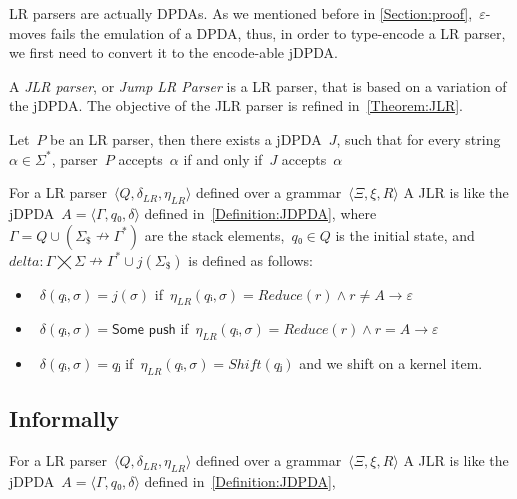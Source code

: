 LR parsers are actually DPDAs\@. As we mentioned before in \cref{Section:proof},~$ε$-moves
  fails the emulation of a DPDA, thus, in order to type-encode a LR parser, we first need
  to convert it to the encode-able jDPDA\@.

A \emph{JLR parser}, or \emph{Jump LR Parser} is a LR parser, that
  is based on a variation of the jDPDA\@.
The objective of the JLR parser is refined in~\cref{Theorem:JLR}.

\begin{Theorem}
  \label{Theorem:JLR}
  Let~$P$ be an LR parser, then there exists a jDPDA~$J$,
  such that for every string~$α∈Σ^*$, parser~$P$ accepts~$α$
    if and only if~$J$ accepts~$α$
\end{Theorem}

For a LR parser~$⟨Q,δ_{LR}, η_{LR}⟩$ defined over a grammar~$⟨Ξ,ξ,R⟩$
A JLR is like the jDPDA~$A=⟨Γ,q₀,δ⟩$ defined in~\cref{Definition:JDPDA},
  where~$Γ= Q∪(Σ_\$↛Γ^*)$ are the stack elements,~$q₀∈Q$
  is the initial state, and~$delta:Γ⨉Σ↛Γ^*∪j(Σ_\$)$ is defined as follows:
  \begin{itemize}
   \item~$δ(qᵢ,σ)= j(σ)$ if~$η_{LR}(qᵢ,σ)=Reduce(r)∧r≠A→ε$
   \item~$δ(qᵢ,σ)= \textsf{Some push}$ if~$η_{LR}(qᵢ,σ)=Reduce(r)∧r=A→ε$
   \item~$δ(qᵢ,σ)= qⱼ$ if~$η_{LR}(qᵢ,σ)=Shift(qⱼ)$ and we shift on a kernel item.
  \end{itemize}

\subsection{Informally}

For a LR parser~$⟨Q,δ_{LR}, η_{LR}⟩$ defined over a grammar~$⟨Ξ,ξ,R⟩$
A JLR is like the jDPDA~$A=⟨Γ,q₀,δ⟩$ defined in~\cref{Definition:JDPDA},

